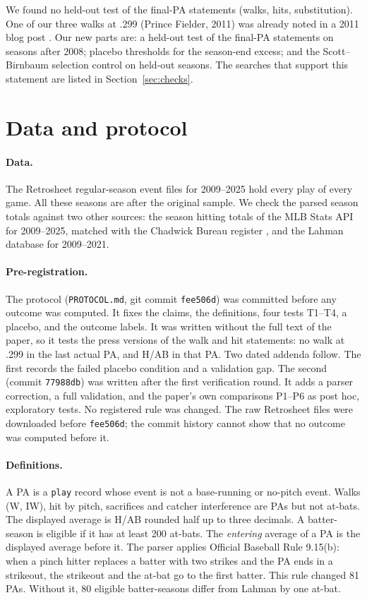\documentclass[11pt]{article}
\begin{document}
We found no held-out test of the final-PA statements (walks, hits, substitution). One of our three walks at .299 (Prince Fielder, 2011) was already noted in a 2011 blog post \cite{lombardi2011}. Our new parts are: a held-out test of the final-PA statements on seasons after 2008; placebo thresholds for the season-end excess; and the Scott--Birnbaum selection control on held-out seasons. The searches that support this statement are listed in Section~\ref{sec:checks}.

\section{Data and protocol}

\paragraph{Data.} The Retrosheet regular-season event files for 2009--2025 \cite{retrosheet} hold every play of every game. All these seasons are after the original sample. We check the parsed season totals against two other sources: the season hitting totals of the MLB Stats API \cite{mlbapi} for 2009--2025, matched with the Chadwick Bureau register \cite{chadwick}, and the Lahman database \cite{lahman} for 2009--2021.

\paragraph{Pre-registration.} The protocol (\texttt{PROTOCOL.md}, git commit \texttt{fee506d}) was committed before any outcome was computed. It fixes the claims, the definitions, four tests T1--T4, a placebo, and the outcome labels. It was written without the full text of the paper, so it tests the press versions of the walk and hit statements: no walk at .299 in the last actual PA, and H/AB in that PA. Two dated addenda follow. The first records the failed placebo condition and a validation gap. The second (commit \texttt{77988db}) was written after the first verification round. It adds a parser correction, a full validation, and the paper's own comparisons P1--P6 as post hoc, exploratory tests. No registered rule was changed. The raw Retrosheet files were downloaded before \texttt{fee506d}; the commit history cannot show that no outcome was computed before it.

\paragraph{Definitions.} A PA is a \texttt{play} record whose event is not a base-running or no-pitch event. Walks (W, IW), hit by pitch, sacrifices and catcher interference are PAs but not at-bats. The displayed average is H/AB rounded half up to three decimals. A batter-season is eligible if it has at least 200 at-bats. The \emph{entering} average of a PA is the displayed average before it. The parser applies Official Baseball Rule 9.15(b): when a pinch hitter replaces a batter with two strikes and the PA ends in a strikeout, the strikeout and the at-bat go to the first batter. This rule changed 81 PAs. Without it, 80 eligible batter-seasons differ from Lahman by one at-bat.
\end{document}
